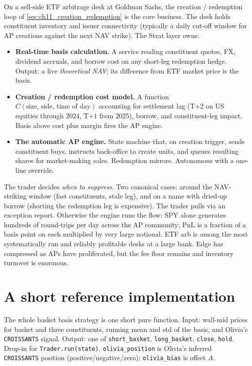 \begin{gsbox}
On a sell-side ETF arbitrage desk at Goldman Sachs, the
creation / redemption loop of \cref{sec:ch11_creation_redemption}
is the core business. The desk holds constituent inventory and
issuer connectivity (typically a daily cut-off window for AP
creations against the next NAV strike). The Strat layer owns:
\begin{itemize}
  \item \textbf{Real-time basis calculation.} A service reading
  constituent quotes, FX, dividend accruals, and borrow cost on
  any short-leg redemption hedge. Output: a live
  \emph{theoretical NAV}; its difference from ETF market price is
  the basis.
  \item \textbf{Creation / redemption cost model.} A function
  $C(\text{size},\,\text{side},\,\text{time of day})$ accounting
  for settlement lag (T+$2$ on US equities through $2024$, T+$1$
  from $2025$), borrow, and constituent-leg impact. Basis above
  cost plus margin fires the AP engine.
  \item \textbf{The automatic AP engine.} State machine that, on
  creation trigger, sends constituent buys, instructs back-office
  to create units, and queues resulting shares for market-making
  sales. Redemption mirrors. Autonomous with a one-line override.
\end{itemize}
The trader decides \emph{when to suppress}. Two canonical cases:
around the NAV-striking window (fast constituents, stale leg),
and on a name with dried-up borrow (shorting the redemption leg
is expensive). The trader pulls via an exception report.
Otherwise the engine runs the flow: SPY alone generates hundreds
of round-trips per day across the AP community; PnL is a fraction
of a basis point on each multiplied by very large notional. ETF
arb is among the most systematically run and reliably profitable
desks at a large bank. Edge has compressed as APs have
proliferated, but the fee floor remains and inventory turnover is
enormous.
\end{gsbox}

\section{A short reference implementation}
\label{sec:ch11_code}

The whole basket basis strategy is one short pure function. Input:
wall-mid prices for basket and three constituents, running mean
and std of the basis, and Olivia's \texttt{CROISSANTS} signal.
Output: one of \texttt{short\_basket}, \texttt{long\_basket},
\texttt{close}, \texttt{hold}. Drop-in for
\texttt{Trader.run(state)}. \texttt{olivia\_position} is Olivia's
inferred \texttt{CROISSANTS} position (positive/negative/zero);
\texttt{olivia\_bias} is offset $A$.

